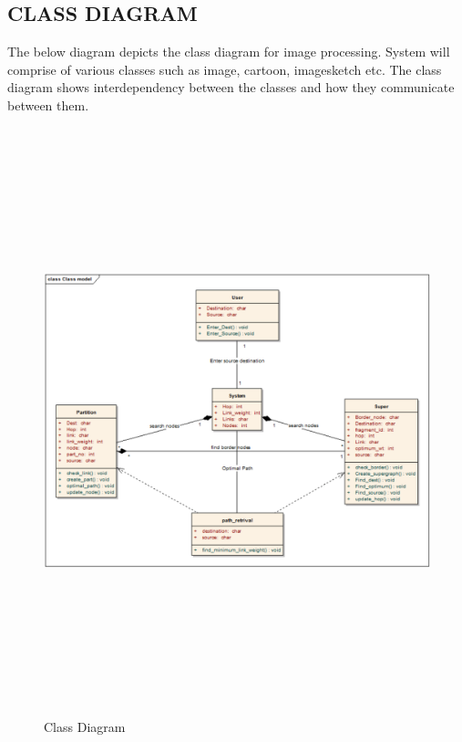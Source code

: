 \begin{center}
\section{\normalsize CLASS DIAGRAM}
\hspace*{5mm} The below diagram depicts the class diagram for image processing. System will comprise of various classes such as image, cartoon, imagesketch etc. The class diagram shows interdependency between the classes and how they communicate between them.\\
\begin{figure}[H]
\includegraphics[width=17cm,height=17cm]{Class.eps}
\caption{Class Diagram}
\end{figure}
\newpage



\end{center}
